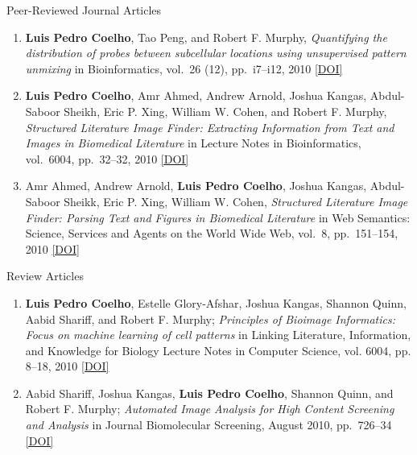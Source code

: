 \documentclass{article}
\renewcommand\subsection[1]{%
    \par\vspace{.1em}%
    {\hspace{1em}\subsubhead #1}%
    \par\vspace{.2em}%
}
\newcommand\showdoi[1]{%
    \href{http://dx.doi.org/#1}{[DOI]}%
}
\begin{document}
\subsection{Peer-Reviewed Journal Articles}
\begin{enumerate}
\item \textbf{Luis Pedro Coelho}, Tao Peng, and Robert F. Murphy,
\emph{Quantifying the distribution of probes between subcellular locations
using unsupervised pattern unmixing} in Bioinformatics, vol.\ 26 (12), pp.\
i7--i12, 2010 \showdoi{10.1093/bioinformatics/btq220}

\item \textbf{Luis Pedro Coelho}, Amr Ahmed, Andrew Arnold, Joshua Kangas,
Abdul-Saboor Sheikh, Eric P. Xing, William W. Cohen, and Robert F. Murphy,
\emph{Structured Literature Image Finder: Extracting Information from Text and
Images in Biomedical Literature} in Lecture Notes in Bioinformatics, vol.\
6004, pp.\ 32--32, 2010 \showdoi{10.1007/978-3-642-13131-8_4}

\item Amr Ahmed, Andrew Arnold, \textbf{Luis Pedro Coelho}, Joshua Kangas,
Abdul-Saboor Sheikk, Eric P. Xing, William W. Cohen, \emph{Structured
Literature Image Finder: Parsing Text and Figures in Biomedical Literature} in
Web Semantics: Science, Services and Agents on the World Wide Web, vol.\ 8,
pp.\ 151--154, 2010 \showdoi{10.1016/j.websem.2010.04.002}

\end{enumerate}

\subsection{Review Articles}
\begin{enumerate}
\item \textbf{Luis Pedro Coelho}, Estelle Glory-Afshar, Joshua Kangas, Shannon
Quinn, Aabid Shariff, and Robert F. Murphy; \emph{Principles of Bioimage
Informatics: Focus on machine learning of cell patterns} in Linking Literature,
Information, and Knowledge for Biology Lecture Notes in Computer Science, vol.
6004, pp. 8--18, 2010 \showdoi{10.1007/978-3-642-13131-8_2}

\item Aabid Shariff, Joshua Kangas, \textbf{Luis Pedro Coelho}, Shannon Quinn,
and Robert F. Murphy; \emph{Automated Image Analysis for High Content Screening
and Analysis} in Journal Biomolecular Screening, August 2010, pp.\ 726--34
\showdoi{10.1177/1087057110370894}

\end{enumerate}
\end{document}
